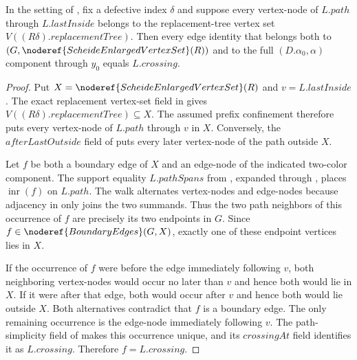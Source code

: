 \begin{helper}
In the setting of , fix a defective index
$\delta$ and suppose every vertex-node of $L.path$ through
$L.\mathit{lastInside}$ belongs to the replacement-tree vertex set
$V((R\delta).\mathit{replacementTree})$.  Then every edge identity that
belongs both to
$(G,\noderef{ScheideEnlargedVertexSet}(R))$ and to
the full $(D.\alpha_0,\alpha)$ component through $y_0$ equals
$L.\mathit{crossing}$.
\end{helper}
\begin{proof}
Put $X=\noderef{ScheideEnlargedVertexSet}(R)$ and
$v=L.\mathit{lastInside}$.  The exact replacement vertex-set field in
 gives
$V((R\delta).\mathit{replacementTree})\subseteq X$.  The assumed prefix
confinement therefore puts every vertex-node of $L.path$ through $v$ in
$X$.  Conversely, the $afterLastOutside$ field of
 puts every later vertex-node of the path
outside $X$.

Let $f$ be both a boundary edge of $X$ and an edge-node of the indicated
two-color component.  The support equality $L.pathSpans$ from
, expanded through
, places $\operatorname{inr}(f)$ on $L.path$.
The walk alternates vertex-nodes and edge-nodes because adjacency in
 only joins the two summands.  Thus the
two path neighbors of this occurrence of $f$ are precisely its two
endpoints in $G$.  Since $f\in\noderef{BoundaryEdges}(G,X)$, exactly one
of these endpoint vertices lies in $X$.

If the occurrence of $f$ were before the edge immediately following
$v$, both neighboring vertex-nodes would occur no later than $v$ and
hence both would lie in $X$.  If it were after that edge, both would
occur after $v$ and hence both would lie outside $X$.  Both alternatives
contradict that $f$ is a boundary edge.  The only remaining occurrence is
the edge-node immediately following $v$.  The path-simplicity field of
 makes this occurrence unique, and its
$crossingAt$ field identifies it as $L.\mathit{crossing}$.  Therefore
$f=L.\mathit{crossing}$.
\end{proof}
